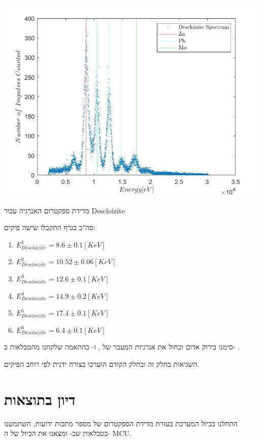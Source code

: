 \documentclass{article}
\begin{document}
\begin{graph}[H]
    \centering
    \includegraphics[width=\textwidth]{Descloizit.png}
    \caption{
    מדידת ספקטרום האנרגיה עבור 
    \textenglish{Descloizite}
    }
    \label{graph:Descloizit-spec}
\end{graph}

סה"כ בגרף התקבלו שישה פיקים:
\begin{enumerate}
    \item $E_{Descloizite}^1 = 8.6 \pm 0.1 [KeV]$
    \item $E_{Descloizite}^2 = 10.52 \pm 0.06 [KeV]$
    \item $E_{Descloizite}^3 = 12.6 \pm 0.1 [KeV]$
    \item $E_{Descloizite}^4 = 14.9 \pm 0.2 [KeV]$
    \item $E_{Descloizite}^5 = 17.4 \pm 0.1 [KeV]$
    \item $E_{Descloizite}^6 = 6.4 \pm 0.1 [KeV]$
\end{enumerate}

סימנו בירוק אדום וכחול את אנרגיות המעבר של
,
ו-
בהתאמה
שלקחנו מהטבלאות ב-
\cite{xrayBooklet}.

השגיאות בחלק זה ובחלק הקודם הוערכו בצורה ידנית לפי רוחב הפיקים.

\clearpage

\section{דיון בתוצאות}

התחלנו בכיול המערכת בעזרת מדידת הספקטרום של מספר מתכות ידועות, השתמשנו בטבלאות שב-
\cite{xrayBooklet}
ומצאנו את הכיול של ה-
\textenglish{MCU}.
\end{document}
